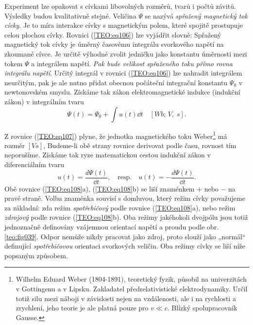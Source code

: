       Experiment lze opakovat s cívkami libovolných rozměrů, tvarů i počtů závitů. Výsledky budou
      kvalitativně stejné. Veličina \(\Psi\) se nazývá \emph{spřažený magnetický tok cívky}. Je to 
      míra interakce cívky s magnetickým polem, které spojitě prostupuje celou plochou cívky. 
      Rovnici (\ref{TEO:eq106}) lze vyjádřit slovně: Spřažený magnetický tok cívky je úměrný 
      časovému integrálu svorkového napětí na zkoumané cívce. Je určitě výhodné zvolit jedničku 
      jako konstantu úměrnosti mezi tokem \(\Psi\) a integrálem napětí. \emph{Pak bude velikost 
      spřaženého toku přímo rovna integrálu napětí}. Určitý integrál v rovnici 
      (\ref{TEO:eq106}) lze nahradit integrálem neurčitým, pak je ale nutno přidat obecnou 
      počáteční integrační konstantu \(\Psi_0\)
      v newtonovském smyslu. Získáme tak zákon elektromagnetické indukce (indukční zákon) v
      integrálním tvaru
      \begin{equation}\label{TEO:eq107}
       \Psi(t) = \Psi_0 + \int u(t)\dd{t} \quad [Wb;\, V,\; s].
      \end{equation}   
    
    Z rovnice (\ref{TEO:eq107}) plyne, že jednotka magnetického toku Weber\footnote{Wilhelm
    Eduard Weber (1804-1891), teoretický fyzik, působil na univerzitách v Gottingenu a v Lipsku.
    Zakladatel předrelativistické elektrodynamiky. Určil totiž silu mezi náboji v závislosti nejen
    na vzdálenosti, ale i na rychlosti a zrychlení, jeho teorie je ale platná pouze pro \(v \ll c\).
    Blízký spolupracovník Gausse.} má rozměr \([Vs]\), Budeme-li obě strany rovnice derivovat podle
    času, rovnost tím neporušíme. Získáme tak ryze matematickou cestou indukční zákon v
    diferenciálním tvaru
    \begin{equation}\label{TEO:eq108}
     u(t) = \frac{d\Psi(t)}{\dd{t}}, \quad \text{resp.} \quad  u(t) = -\frac{d\Psi(t)}{\dd{t}}.
    \end{equation}   
    Obě rovnice (\ref{TEO:eq108}a), (\ref{TEO:eq108}b) se liší znaménkem \(+\) nebo
    \(-\) na pravé straně. Volba znaménka souvisí s domluvou, který režim cívky považujeme za
    základní: zda režim \emph{spotřebičový} podle rovnice (\ref{TEO:eq108}a), nebo režim
    \emph{zdrojový} podle rovnice (\ref{TEO:eq108}b). Oba režimy jakéhokoli dvojpólu jsou
    totiž jednoznačně definovány vzájemnou orientací napětí a proudu podle obr.
    \ref{teo:fig039}. Odpor nemůže nikdy pracovat jako zdroj, proto slouží jako
    „normál“ definující \emph{spotřebičovou} orientaci svorkových veličin. Oba režimy cívky se liší
    níže popsaným způsobem.


